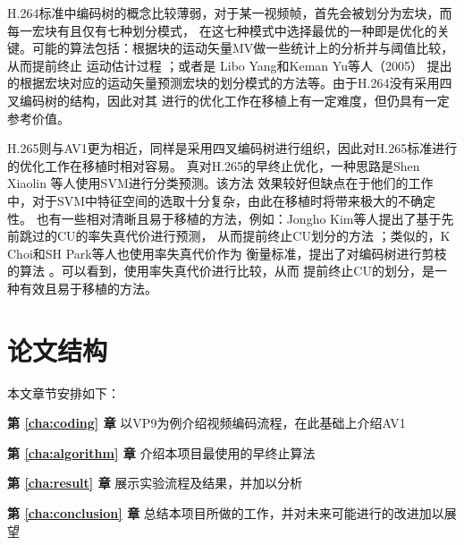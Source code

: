 H.264标准中编码树的概念比较薄弱，对于某一视频帧，首先会被划分为宏块，而每一宏块有且仅有七种划分模式，
在这七种模式中选择最优的一种即是优化的关键。可能的算法包括：根据块的运动矢量MV做一些统计上的分析并与阈值比较，从而提前终止
运动估计过程 \cite{xu2003efficient} ；或者是 Libo Yang和Keman Yu等人（2005）\cite{yang2005effective}
提出的根据宏块对应的运动矢量预测宏块的划分模式的方法等。由于H.264没有采用四叉编码树的结构，因此对其
进行的优化工作在移植上有一定难度，但仍具有一定参考价值。

H.265则与AV1更为相近，同样是采用四叉编码树进行组织，因此对H.265标准进行的优化工作在移植时相对容易。
真对H.265的早终止优化，一种思路是Shen Xiaolin 等人使用SVM进行分类预测\cite{shen2013cu}。该方法
效果较好但缺点在于他们的工作中，对于SVM中特征空间的选取十分复杂，由此在移植时将带来极大的不确定性。
也有一些相对清晰且易于移植的方法，例如：Jongho Kim等人提出了基于先前跳过的CU的率失真代价进行预测，
从而提前终止CU划分的方法 \cite{kim2012adaptive}；类似的，K Choi和SH Park等人也使用率失真代价作为
衡量标准，提出了对编码树进行剪枝的算法 \cite{choi2011coding}。可以看到，使用率失真代价进行比较，从而
提前终止CU的划分，是一种有效且易于移植的方法。

\section{论文结构}

本文章节安排如下：

\textbf{第 \ref{cha:coding} 章} \; 以VP9为例介绍视频编码流程，在此基础上介绍AV1

\textbf{第 \ref{cha:algorithm} 章} \; 介绍本项目最使用的早终止算法 

\textbf{第 \ref{cha:result} 章} \; 展示实验流程及结果，并加以分析

\textbf{第 \ref{cha:conclusion} 章} \; 总结本项目所做的工作，并对未来可能进行的改进加以展望